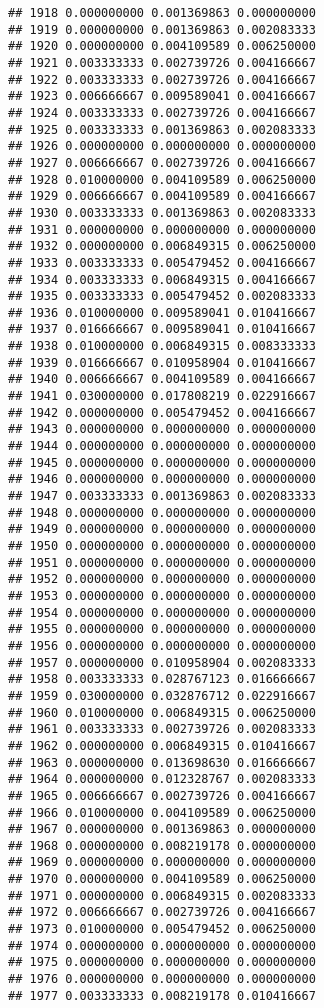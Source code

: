 \documentclass[
]{article}
\begin{document}
\begin{verbatim}
## 1918 0.000000000 0.001369863 0.000000000
## 1919 0.000000000 0.001369863 0.002083333
## 1920 0.000000000 0.004109589 0.006250000
## 1921 0.003333333 0.002739726 0.004166667
## 1922 0.003333333 0.002739726 0.004166667
## 1923 0.006666667 0.009589041 0.004166667
## 1924 0.003333333 0.002739726 0.004166667
## 1925 0.003333333 0.001369863 0.002083333
## 1926 0.000000000 0.000000000 0.000000000
## 1927 0.006666667 0.002739726 0.004166667
## 1928 0.010000000 0.004109589 0.006250000
## 1929 0.006666667 0.004109589 0.004166667
## 1930 0.003333333 0.001369863 0.002083333
## 1931 0.000000000 0.000000000 0.000000000
## 1932 0.000000000 0.006849315 0.006250000
## 1933 0.003333333 0.005479452 0.004166667
## 1934 0.003333333 0.006849315 0.004166667
## 1935 0.003333333 0.005479452 0.002083333
## 1936 0.010000000 0.009589041 0.010416667
## 1937 0.016666667 0.009589041 0.010416667
## 1938 0.010000000 0.006849315 0.008333333
## 1939 0.016666667 0.010958904 0.010416667
## 1940 0.006666667 0.004109589 0.004166667
## 1941 0.030000000 0.017808219 0.022916667
## 1942 0.000000000 0.005479452 0.004166667
## 1943 0.000000000 0.000000000 0.000000000
## 1944 0.000000000 0.000000000 0.000000000
## 1945 0.000000000 0.000000000 0.000000000
## 1946 0.000000000 0.000000000 0.000000000
## 1947 0.003333333 0.001369863 0.002083333
## 1948 0.000000000 0.000000000 0.000000000
## 1949 0.000000000 0.000000000 0.000000000
## 1950 0.000000000 0.000000000 0.000000000
## 1951 0.000000000 0.000000000 0.000000000
## 1952 0.000000000 0.000000000 0.000000000
## 1953 0.000000000 0.000000000 0.000000000
## 1954 0.000000000 0.000000000 0.000000000
## 1955 0.000000000 0.000000000 0.000000000
## 1956 0.000000000 0.000000000 0.000000000
## 1957 0.000000000 0.010958904 0.002083333
## 1958 0.003333333 0.028767123 0.016666667
## 1959 0.030000000 0.032876712 0.022916667
## 1960 0.010000000 0.006849315 0.006250000
## 1961 0.003333333 0.002739726 0.002083333
## 1962 0.000000000 0.006849315 0.010416667
## 1963 0.000000000 0.013698630 0.016666667
## 1964 0.000000000 0.012328767 0.002083333
## 1965 0.006666667 0.002739726 0.004166667
## 1966 0.010000000 0.004109589 0.006250000
## 1967 0.000000000 0.001369863 0.000000000
## 1968 0.000000000 0.008219178 0.000000000
## 1969 0.000000000 0.000000000 0.000000000
## 1970 0.000000000 0.004109589 0.006250000
## 1971 0.000000000 0.006849315 0.002083333
## 1972 0.006666667 0.002739726 0.004166667
## 1973 0.010000000 0.005479452 0.006250000
## 1974 0.000000000 0.000000000 0.000000000
## 1975 0.000000000 0.000000000 0.000000000
## 1976 0.000000000 0.000000000 0.000000000
## 1977 0.003333333 0.008219178 0.010416667

\end{verbatim}
\end{document}
